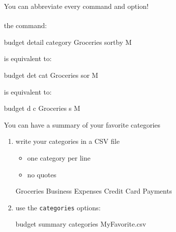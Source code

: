 \documentclass[12pt,letterpaper]{article}
\begin{document}
\Large
\begin{framed}
    \begin{minipage}[t][3in][t]{5in}
        You can abbreviate every command and option! \\ \\
        the command:
        \begin{budget}
            budget detail category Groceries sortby M
        \end{budget}
        is equivalent to: 
        \begin{budget}
            budget det cat Groceries sor M
        \end{budget}
        is equivalent to: 
        \begin{budget}
            budget d c Groceries s M
        \end{budget}
    \end{minipage}
\end{framed}
\begin{framed}
    \begin{minipage}[t][3in][t]{5in}
        You can have a summary of your favorite categories 
        \large
        \begin{enumerate}
            \item write your categories in a CSV file
                \begin{itemize}
                    \item one category per line
                    \item no quotes
                \end{itemize}
                \begin{budget}
                    Groceries
                    Business Expenses
                    Credit Card Payments
                \end{budget}
            \item use the \lstinline[language=budget,basicstyle=\large]!categories! options:
                \begin{budget}
                    budget summary categories MyFavorite.csv 
                \end{budget}
        \end{enumerate}
    \end{minipage}
\end{framed}
\end{document}
